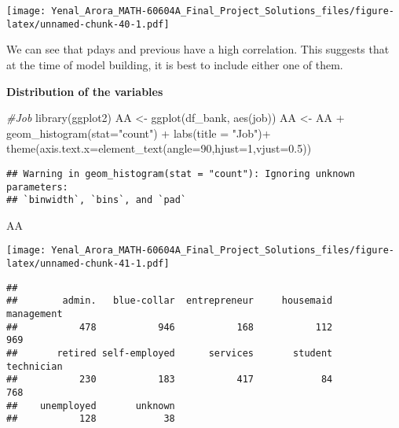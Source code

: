\documentclass[
]{article}
\newenvironment{Shaded}{\begin{snugshade}}{\end{snugshade}}
\newcommand{\AttributeTok}[1]{\textcolor[rgb]{0.77,0.63,0.00}{#1}}
\newcommand{\CommentTok}[1]{\textcolor[rgb]{0.56,0.35,0.01}{\textit{#1}}}
\newcommand{\DecValTok}[1]{\textcolor[rgb]{0.00,0.00,0.81}{#1}}
\newcommand{\FloatTok}[1]{\textcolor[rgb]{0.00,0.00,0.81}{#1}}
\newcommand{\FunctionTok}[1]{\textcolor[rgb]{0.00,0.00,0.00}{#1}}
\newcommand{\NormalTok}[1]{#1}
\newcommand{\OtherTok}[1]{\textcolor[rgb]{0.56,0.35,0.01}{#1}}
\newcommand{\SpecialCharTok}[1]{\textcolor[rgb]{0.00,0.00,0.00}{#1}}
\newcommand{\StringTok}[1]{\textcolor[rgb]{0.31,0.60,0.02}{#1}}
\begin{document}
\texttt{[image: Yenal\_Arora\_MATH-60604A\_Final\_Project\_Solutions\_files/figure-latex/unnamed-chunk-40-1.pdf]}

We can see that pdays and previous have a high correlation. This
suggests that at the time of model building, it is best to include
either one of them.

\textbf{Distribution of the variables}

\begin{Shaded}
\begin{Highlighting}[]
\CommentTok{\#Job}
\FunctionTok{library}\NormalTok{(ggplot2)}
\NormalTok{AA }\OtherTok{\textless{}{-}} \FunctionTok{ggplot}\NormalTok{(df\_bank, }\FunctionTok{aes}\NormalTok{(job))}
\NormalTok{AA }\OtherTok{\textless{}{-}}\NormalTok{ AA  }\SpecialCharTok{+} \FunctionTok{geom\_histogram}\NormalTok{(}\AttributeTok{stat=}\StringTok{"count"}\NormalTok{) }\SpecialCharTok{+} \FunctionTok{labs}\NormalTok{(}\AttributeTok{title =} \StringTok{"Job"}\NormalTok{)}\SpecialCharTok{+}
  \FunctionTok{theme}\NormalTok{(}\AttributeTok{axis.text.x=}\FunctionTok{element\_text}\NormalTok{(}\AttributeTok{angle=}\DecValTok{90}\NormalTok{,}\AttributeTok{hjust=}\DecValTok{1}\NormalTok{,}\AttributeTok{vjust=}\FloatTok{0.5}\NormalTok{))}
\end{Highlighting}
\end{Shaded}

\begin{verbatim}
## Warning in geom_histogram(stat = "count"): Ignoring unknown parameters:
## `binwidth`, `bins`, and `pad`
\end{verbatim}

\begin{Shaded}
\begin{Highlighting}[]
\NormalTok{AA}
\end{Highlighting}
\end{Shaded}

\texttt{[image: Yenal\_Arora\_MATH-60604A\_Final\_Project\_Solutions\_files/figure-latex/unnamed-chunk-41-1.pdf]}

\begin{Shaded}
\end{Shaded}

\begin{verbatim}
## 
##        admin.   blue-collar  entrepreneur     housemaid    management 
##           478           946           168           112           969 
##       retired self-employed      services       student    technician 
##           230           183           417            84           768 
##    unemployed       unknown 
##           128            38
\end{verbatim}
\end{document}
